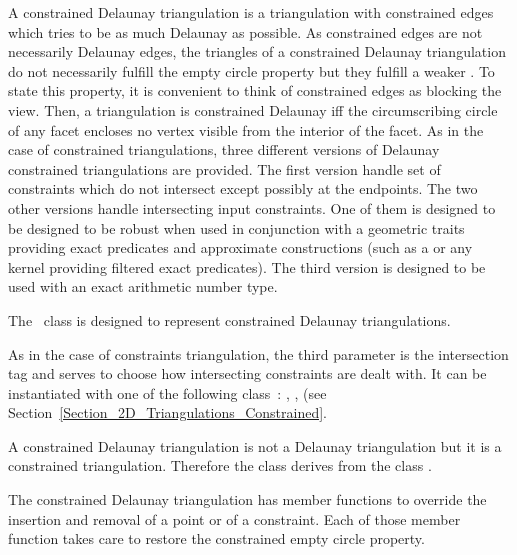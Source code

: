 A constrained Delaunay triangulation is a triangulation with
constrained edges which tries to be as much Delaunay as possible.
As constrained edges are not necessarily Delaunay edges,
the triangles of a constrained Delaunay triangulation do not
necessarily fulfill the empty circle property
but they fulfill a weaker .
 To state this property,
it is convenient to think of  constrained
edges as blocking the view. Then, a triangulation is 
constrained Delaunay iff
 the circumscribing circle
of any facet encloses 
no vertex  visible
from the interior of the facet.
As in the case of constrained triangulations, three different versions
of Delaunay constrained triangulations are provided. The first version
handle set of constraints which do not intersect except possibly
at the endpoints. The two other versions 
handle intersecting input constraints. One of them
 is designed to be designed to be robust
when used in conjunction with a geometric traits
providing exact predicates and approximate constructions
(such as a  or any kernel providing
filtered exact predicates). The third version is designed to be used
with an exact arithmetic number type.




The \cgal\ class
is designed to represent
constrained Delaunay triangulations.

As in the case of constraints triangulation, the third parameter 
 is the intersection tag
and serves to choose how intersecting constraints
are dealt with. It can be instantiated with one of the following
class~: ,
,
(see Section~\ref{Section_2D_Triangulations_Constrained}.

A constrained Delaunay triangulation is not a Delaunay
triangulation but it is a constrained triangulation.
Therefore the class
derives from
the class .

The constrained Delaunay triangulation
has member functions to override the 
insertion and removal of a point or of a constraint.
Each of those member function takes care
to  restore
 the constrained empty circle
property.

